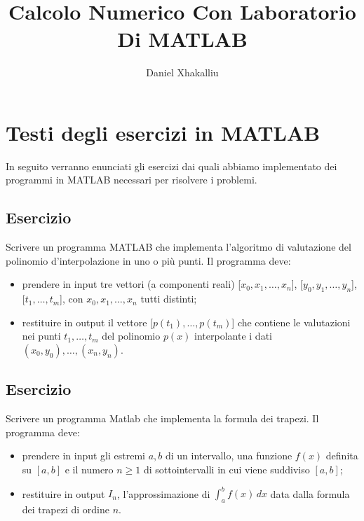 \documentclass[a4paper,12pt]{article}
\begin{document}
\author{Daniel Xhakalliu}
\title{Calcolo Numerico Con Laboratorio Di MATLAB}
\maketitle
\clearpage
\tableofcontents
\clearpage



\section{Testi degli esercizi in MATLAB}
In seguito verranno enunciati gli esercizi dai quali abbiamo implementato dei programmi in MATLAB necessari per risolvere i problemi.
\subsection{Esercizio}
Scrivere un programma MATLAB che implementa l’algoritmo di valutazione del polinomio d'interpolazione in uno o più punti. Il programma deve:
\begin{itemize}
\item prendere in input tre vettori (a componenti reali) [$x_0, x_1,\dots, x_n$], [$y_0, y_1,\dots, y_n$], [$t_1,\dots, t_m$], con $x_0, x_1,\dots, x_n$ tutti distinti;
\item restituire in output il vettore [$p(t_1),\dots, p(t_m)$] che contiene le valutazioni nei punti $t_1,\dots, t_m$ del polinomio $p(x)$ interpolante i dati $(x_0, y_0),\dots, (x_n, y_n)$.
\end{itemize}
\subsection{Esercizio}
Scrivere un programma Matlab che implementa la formula dei trapezi. Il programma
deve:
\begin{itemize}
\item prendere in input gli estremi $a, b$ di un intervallo, una funzione $f(x)$ definita su $[a, b]$ e il numero $n\geq1$ di
sottointervalli in cui viene suddiviso $[a, b]$;
\item restituire in output $I_n$, l’approssimazione di
$\int_{a}^{b} f(x) \,dx$ data dalla formula dei trapezi di ordine $n$.
\end{itemize}
\end{document}
